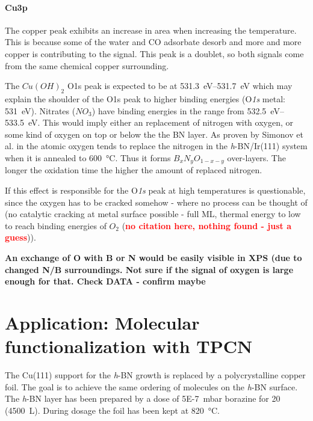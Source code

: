 \paragraph{Cu3p}
The copper peak exhibits an increase in area when increasing the temperature. This is because some of the water and CO adsorbate desorb and more and more copper is contributing to the signal. This peak is a doublet, so both signals come from the same chemical copper surrounding.


The $Cu(OH)_2$ O1s peak is expected to be at \SIrange{531.3}{531.7}{\eV}\cite{deroubaix_x-ray_1992} which may explain the shoulder of the O1s peak to higher binding energies (O\textit{1s} metal: \SI{531}{\eV}). Nitrates ($NO_3$) have binding energies in the range from \SIrange{532.5}{533.5}{\eV}\cite[45]{wanger_handbook_1979}. This would imply either an replacement of nitrogen with oxygen, or some kind of oxygen on top or below the the BN layer. As proven by Simonov et al. in \cite{simonov_controllable_2012} the atomic oxygen tends to replace the nitrogen in the \textit{h}-BN/Ir(111) system when it is annealed to \SI{600}{\degreeCelsius}. Thus it forms $B_{x}N_{y}O_{1-x-y}$ over-layers. The longer the oxidation time the higher the amount of replaced nitrogen. 

If this effect is responsible for the O\textit{1s} peak at high temperatures is questionable, since the oxygen has to be cracked somehow - where no process can be thought of (no catalytic cracking at metal surface possible - full ML, thermal energy to low to reach binding energies of $O_2$ (\textcolor{red}{\textbf{no citation here, nothing found - just a guess}})).

\textbf{An exchange of O with B or N would be easily visible in XPS (due to changed N/B surroundings. Not sure if the signal of oxygen is large enough for that. Check DATA - confirm maybe}

  \section{Application: Molecular functionalization with TPCN}
  The Cu(111) support for the \textit{h}-BN growth is replaced by a polycrystalline copper foil. The goal is to achieve the same ordering of molecules on the \textit{h}-BN surface. The \textit{h}-BN layer has been prepared by a dose of \SI{5E-7}{\milli\bar} borazine for \SI{20}{\min} (\SI{4500}{\L}). During dosage the foil has been kept at \SI{820}{\celsius}.
  
